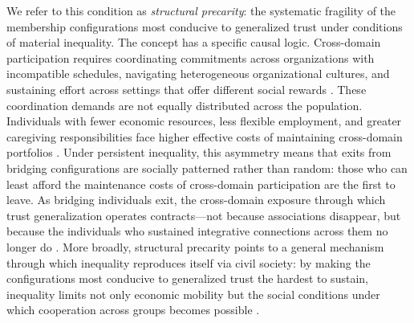We refer to this condition as \textit{structural precarity}: the systematic fragility of the membership configurations most conducive to generalized trust under conditions of material inequality. The concept has a specific causal logic. Cross-domain participation requires coordinating commitments across organizations with incompatible schedules, navigating heterogeneous organizational cultures, and sustaining effort across settings that offer different social rewards \parencite{simmel_conflict_1922}. These coordination demands are not equally distributed across the population. Individuals with fewer economic resources, less flexible employment, and greater caregiving responsibilities face higher effective costs of maintaining cross-domain portfolios \parencite{oxhorn_neopluralism_2004, cook2005cooperation}. Under persistent inequality, this asymmetry means that exits from bridging configurations are socially patterned rather than random: those who can least afford the maintenance costs of cross-domain participation are the first to leave. As bridging individuals exit, the cross-domain exposure through which trust generalization operates contracts---not because associations disappear, but because the individuals who sustained integrative connections across them no longer do \parencite{wellman_community_1979, fukuyama1996trust}. More broadly, structural precarity points to a general mechanism through which inequality reproduces itself via civil society: by making the configurations most conducive to generalized trust the hardest to sustain, inequality limits not only economic mobility but the social conditions under which cooperation
across groups becomes possible \parencite{cook2005cooperation, fukuyama1996trust}.

